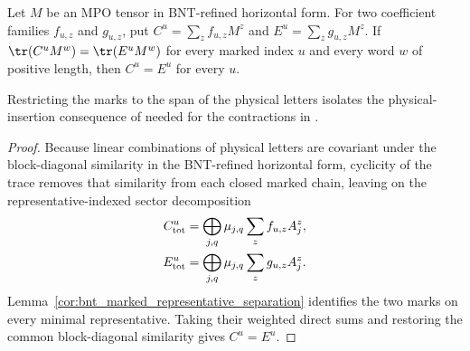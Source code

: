 \begin{corollary}
    \label{cor:horizontal_cf_linear_marked_separation}
    \leanok
    Let $M$ be an MPO tensor in BNT-refined horizontal form. For two
    coefficient families $f_{u,z}$ and $g_{u,z}$, put
    $C^u=\sum_z f_{u,z}M^z$ and $E^u=\sum_z g_{u,z}M^z$.
    If $\tr(C^uM^w)=\tr(E^uM^w)$ for every marked index $u$ and every word
    $w$ of positive length, then $C^u=E^u$ for every $u$.

    Restricting the marks to the span of the physical letters isolates the
    physical-insertion consequence of
    \cite[Appendix~C.3, lines~1835--1858]{Cirac2016MPDO_arXiv} needed for the
    contractions in \cite[Proposition~4.13, lines~1909--1919]{Cirac2016MPDO_arXiv}.
\end{corollary}

\begin{proof}
    \leanok
    Because linear combinations of physical letters are covariant under the
    block-diagonal similarity in the BNT-refined horizontal form,
    cyclicity of the trace removes that similarity from each closed marked
    chain, leaving on the representative-indexed sector decomposition
    \begin{align}
        C_{\mathrm{tot}}^u
         & =\bigoplus_{j,q}\mu_{j,q}
        \sum_z f_{u,z}A_j^z,
        \notag                       \\
        E_{\mathrm{tot}}^u
         & =\bigoplus_{j,q}\mu_{j,q}
        \sum_z g_{u,z}A_j^z.
        \notag
    \end{align}
    Lemma~\ref{cor:bnt_marked_representative_separation} identifies the
    two marks on every minimal representative. Taking their weighted direct
    sums and restoring the common block-diagonal similarity gives
    $C^u=E^u$.
\end{proof}
